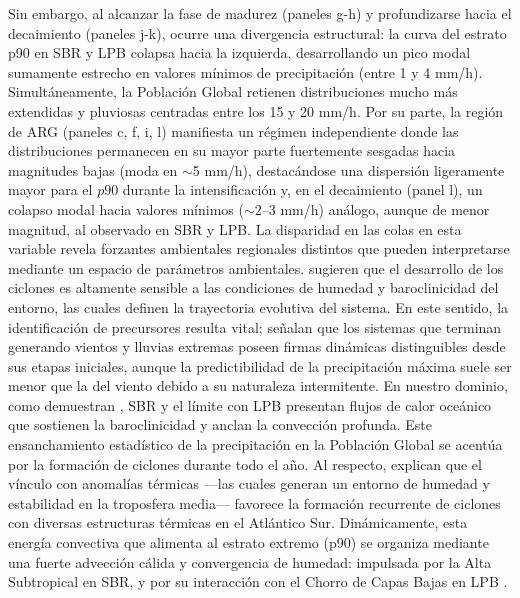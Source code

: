 Sin embargo, al alcanzar la fase de madurez (paneles g-h) y profundizarse hacia el decaimiento (paneles j-k), ocurre una divergencia estructural: la curva del estrato p90 en SBR y LPB colapsa hacia la izquierda, desarrollando un pico modal sumamente estrecho en valores mínimos de precipitación (entre 1 y 4 mm/h). 
Simultáneamente, la Población Global retienen distribuciones mucho más extendidas y pluviosas centradas entre los 15 y 20 mm/h. 
Por su parte, la región de ARG (paneles c, f, i, l) manifiesta un régimen independiente donde las distribuciones permanecen en su mayor parte fuertemente sesgadas hacia magnitudes bajas (moda en $\sim$5 mm/h), destacándose una dispersión ligeramente mayor para el $p90$ durante la intensificación y, en el decaimiento (panel l), un colapso modal hacia valores mínimos ($\sim$2--3 mm/h) análogo, aunque de menor magnitud, al observado en SBR y LPB.
La disparidad en las colas en esta variable revela forzantes ambientales regionales distintos que pueden interpretarse mediante un espacio de parámetros ambientales. 
\citet{yanase2014parameter} sugieren que el desarrollo de los ciclones es altamente sensible a las condiciones de humedad y baroclinicidad del entorno, las cuales definen la trayectoria evolutiva del sistema. 
En este sentido, la identificación de precursores resulta vital; \citet{laurila2021characteristics} señalan que los sistemas %
que terminan generando vientos y lluvias extremas poseen firmas dinámicas distinguibles desde sus etapas iniciales, aunque la predictibilidad de la precipitación máxima suele ser menor que la del viento debido a su naturaleza intermitente. 
En nuestro dominio, como demuestran \citet{russo2025impacts}, SBR y el límite con LPB presentan flujos de calor oceánico que sostienen la baroclinicidad y anclan la convección profunda. 
Este ensanchamiento estadístico de la precipitación en la Población Global se acentúa por la formación de ciclones durante todo el año. Al respecto, \citet{evans2012climatology} explican que el vínculo con anomalías térmicas —las cuales generan un entorno de humedad y estabilidad en la troposfera media— favorece la formación recurrente de ciclones con diversas estructuras térmicas en el Atlántico Sur.
Dinámicamente, esta energía convectiva que alimenta al estrato extremo (p90) se organiza mediante una fuerte advección cálida y convergencia de humedad: impulsada por la Alta Subtropical en SBR, y por su interacción con el Chorro de Capas Bajas en LPB \citep{gramcianinov2024early}.

